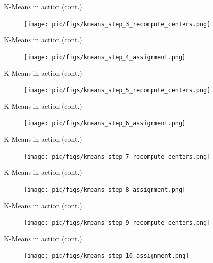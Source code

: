 \documentclass[serif, aspectratio=169]{beamer}
\begin{document}
\begin{frame}{K-Means in action (cont.)}
    \begin{figure}
        \centering
        \texttt{[image: pic/figs/kmeans\_step\_3\_recompute\_centers.png]}
    \end{figure}
\end{frame}
\begin{frame}{K-Means in action (cont.)}
    \begin{figure}
        \centering
        \texttt{[image: pic/figs/kmeans\_step\_4\_assignment.png]}
    \end{figure}
\end{frame}
\begin{frame}{K-Means in action (cont.)}
    \begin{figure}
        \centering
        \texttt{[image: pic/figs/kmeans\_step\_5\_recompute\_centers.png]}
    \end{figure}
\end{frame}
\begin{frame}{K-Means in action (cont.)}
    \begin{figure}
        \centering
        \texttt{[image: pic/figs/kmeans\_step\_6\_assignment.png]}
    \end{figure}
\end{frame}
\begin{frame}{K-Means in action (cont.)}
    \begin{figure}
        \centering
        \texttt{[image: pic/figs/kmeans\_step\_7\_recompute\_centers.png]}
    \end{figure}
\end{frame}
\begin{frame}{K-Means in action (cont.)}
    \begin{figure}
        \centering
        \texttt{[image: pic/figs/kmeans\_step\_8\_assignment.png]}
    \end{figure}
\end{frame}
\begin{frame}{K-Means in action (cont.)}
    \begin{figure}
        \centering
        \texttt{[image: pic/figs/kmeans\_step\_9\_recompute\_centers.png]}
    \end{figure}
\end{frame}
\begin{frame}{K-Means in action (cont.)}
    \begin{figure}
        \centering
        \texttt{[image: pic/figs/kmeans\_step\_10\_assignment.png]}
    \end{figure}
\end{frame}
\end{document}
